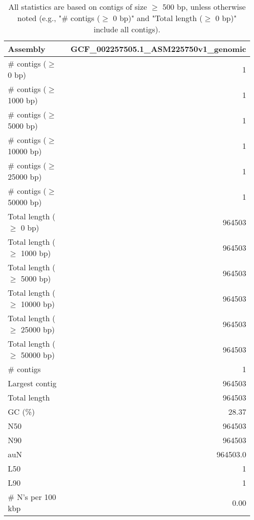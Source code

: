 \documentclass[12pt,a4paper]{article}
\begin{document}
\begin{table}[ht]
\begin{center}
\caption{All statistics are based on contigs of size $\geq$ 500 bp, unless otherwise noted (e.g., "\# contigs ($\geq$ 0 bp)" and "Total length ($\geq$ 0 bp)" include all contigs).}
\begin{tabular}{|l*{1}{|r}|}
\hline
Assembly & GCF\_002257505.1\_ASM225750v1\_genomic \\ \hline
\# contigs ($\geq$ 0 bp) & 1 \\ \hline
\# contigs ($\geq$ 1000 bp) & 1 \\ \hline
\# contigs ($\geq$ 5000 bp) & 1 \\ \hline
\# contigs ($\geq$ 10000 bp) & 1 \\ \hline
\# contigs ($\geq$ 25000 bp) & 1 \\ \hline
\# contigs ($\geq$ 50000 bp) & 1 \\ \hline
Total length ($\geq$ 0 bp) & 964503 \\ \hline
Total length ($\geq$ 1000 bp) & 964503 \\ \hline
Total length ($\geq$ 5000 bp) & 964503 \\ \hline
Total length ($\geq$ 10000 bp) & 964503 \\ \hline
Total length ($\geq$ 25000 bp) & 964503 \\ \hline
Total length ($\geq$ 50000 bp) & 964503 \\ \hline
\# contigs & 1 \\ \hline
Largest contig & 964503 \\ \hline
Total length & 964503 \\ \hline
GC (\%) & 28.37 \\ \hline
N50 & 964503 \\ \hline
N90 & 964503 \\ \hline
auN & 964503.0 \\ \hline
L50 & 1 \\ \hline
L90 & 1 \\ \hline
\# N's per 100 kbp & 0.00 \\ \hline
\end{tabular}
\end{center}
\end{table}
\end{document}
